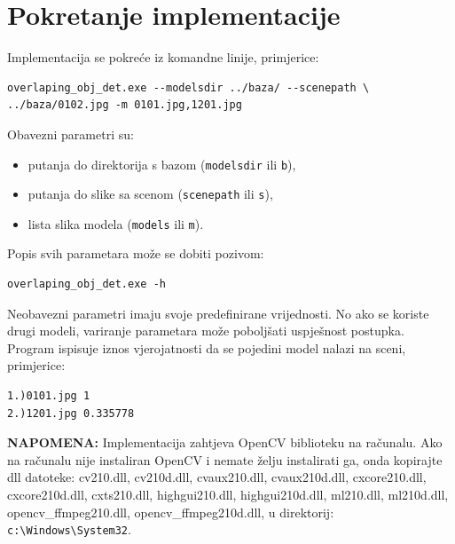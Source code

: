 \documentclass[lmodern, utf8, seminar, numeric]{fer}
\begin{document}
\section{Pokretanje implementacije}
Implementacija se pokreće iz komandne linije, primjerice:
\begin{verbatim}
overlaping_obj_det.exe --modelsdir ../baza/ --scenepath \
../baza/0102.jpg -m 0101.jpg,1201.jpg
\end{verbatim}
Obavezni parametri su:
\begin{itemize}
  \item putanja do direktorija s bazom (\texttt{modelsdir} ili \texttt{b}),
  \item putanja do slike sa scenom (\texttt{scenepath} ili \texttt{s}),
  \item lista slika modela (\texttt{models} ili \texttt{m}).
\end{itemize}
Popis svih parametara može se dobiti pozivom:
\begin{verbatim}
overlaping_obj_det.exe -h
\end{verbatim}

Neobavezni parametri imaju svoje predefinirane vrijednosti. No ako se koriste
drugi modeli, variranje parametara može poboljšati uspješnost postupka.
Program ispisuje iznos vjerojatnosti da se pojedini model nalazi na sceni,
primjerice:
\begin{verbatim}
1.)0101.jpg 1
2.)1201.jpg 0.335778
\end{verbatim}
\textbf{NAPOMENA:} Implementacija zahtjeva OpenCV biblioteku na računalu. Ako na računalu
nije instaliran OpenCV i nemate želju instalirati ga, onda kopirajte dll
datoteke: cv210.dll, cv210d.dll, cvaux210.dll, cvaux210d.dll, cxcore210.dll,
cxcore210d.dll, cxts210.dll, highgui210.dll, highgui210d.dll, ml210.dll,
ml210d.dll, opencv\_ffmpeg210.dll, opencv\_ffmpeg210d.dll, u direktorij:\\
\verb|c:\Windows\System32|.
\end{document}
